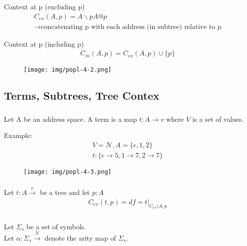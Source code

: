 \documentclass{article}
\begin{document}
\subsubsection{}
Context at p (excluding p)
\begin{gather}
    C_{ex}(A, p) = A\backslash pA@p\\
    \xrightarrow{} \text{concatenating p with each address (in subtree) relative to p}
\end{gather}

Context at p (including p)
\begin{gather}
    C_{in}(A, p) = C_{ex}(A,p) \cup \{p\}
\end{gather}
\begin{figure}[htbp]
    \center
    \texttt{[image: img/popl-4-2.png]}
    \caption{}
\end{figure}

\subsection{Terms, Subtrees, Tree Contex}
\subsubsection{}
Let A be an address space. A term is a map $t:A\xrightarrow{}v$ where $V$ is a set of values.

Example:
\begin{gather}
    V = \mathcal{N}, A = \{\epsilon, 1, 2\}\\
    t: \{\epsilon\xrightarrow{}5, 1\xrightarrow{}7, 2\xrightarrow{}7\}
\end{gather}

\begin{figure}[htbp]
    \center
    \texttt{[image: img/popl-4-3.png]}
    \caption{}
\end{figure}

\subsubsection{}
Let $t:A\xrightarrow{v}$ be a tree and let $p:A$
\begin{gather}
    C_{ex}(t,p) = df = t \vert_{C_{ex}(A,p}
\end{gather}

\subsubsection{}
Let $\Sigma_{s}$ be a set of symbols.\\
Let $\alpha: \Sigma_{s} \xrightarrow{ \mathcal{N}}$ denote the arity map of $\Sigma_{s}$.\\
\end{document}
